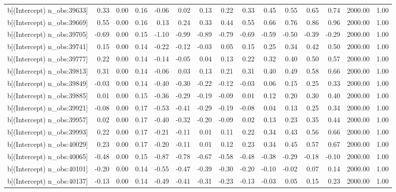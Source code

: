 \begin{table}[ht]
\begin{tabular}{rrrrrrrrrrrrrrr}
  b[(Intercept) n\_obs:39633] & 0.33 & 0.00 & 0.16 & -0.06 & 0.02 & 0.13 & 0.22 & 0.33 & 0.45 & 0.55 & 0.65 & 0.74 & 2000.00 & 1.00 \\ 
  b[(Intercept) n\_obs:39669] & 0.55 & 0.00 & 0.16 & 0.13 & 0.24 & 0.33 & 0.44 & 0.55 & 0.66 & 0.76 & 0.86 & 0.96 & 2000.00 & 1.00 \\ 
  b[(Intercept) n\_obs:39705] & -0.69 & 0.00 & 0.15 & -1.10 & -0.99 & -0.89 & -0.79 & -0.69 & -0.59 & -0.50 & -0.39 & -0.29 & 2000.00 & 1.00 \\ 
  b[(Intercept) n\_obs:39741] & 0.15 & 0.00 & 0.14 & -0.22 & -0.12 & -0.03 & 0.05 & 0.15 & 0.25 & 0.34 & 0.42 & 0.50 & 2000.00 & 1.00 \\ 
  b[(Intercept) n\_obs:39777] & 0.22 & 0.00 & 0.14 & -0.14 & -0.05 & 0.04 & 0.13 & 0.22 & 0.32 & 0.40 & 0.50 & 0.57 & 2000.00 & 1.00 \\ 
  b[(Intercept) n\_obs:39813] & 0.31 & 0.00 & 0.14 & -0.06 & 0.03 & 0.13 & 0.21 & 0.31 & 0.40 & 0.49 & 0.58 & 0.66 & 2000.00 & 1.00 \\ 
  b[(Intercept) n\_obs:39849] & -0.03 & 0.00 & 0.14 & -0.40 & -0.30 & -0.22 & -0.12 & -0.03 & 0.06 & 0.15 & 0.25 & 0.33 & 2000.00 & 1.00 \\ 
  b[(Intercept) n\_obs:39885] & 0.01 & 0.00 & 0.15 & -0.36 & -0.29 & -0.19 & -0.09 & 0.01 & 0.12 & 0.20 & 0.30 & 0.40 & 2000.00 & 1.00 \\ 
  b[(Intercept) n\_obs:39921] & -0.08 & 0.00 & 0.17 & -0.53 & -0.41 & -0.29 & -0.19 & -0.08 & 0.04 & 0.13 & 0.25 & 0.34 & 2000.00 & 1.00 \\ 
  b[(Intercept) n\_obs:39957] & 0.02 & 0.00 & 0.17 & -0.40 & -0.32 & -0.20 & -0.09 & 0.02 & 0.13 & 0.23 & 0.35 & 0.44 & 2000.00 & 1.00 \\ 
  b[(Intercept) n\_obs:39993] & 0.22 & 0.00 & 0.17 & -0.21 & -0.11 & 0.01 & 0.11 & 0.22 & 0.34 & 0.43 & 0.56 & 0.66 & 2000.00 & 1.00 \\ 
  b[(Intercept) n\_obs:40029] & 0.23 & 0.00 & 0.17 & -0.20 & -0.11 & 0.01 & 0.12 & 0.23 & 0.34 & 0.45 & 0.57 & 0.67 & 2000.00 & 1.00 \\ 
  b[(Intercept) n\_obs:40065] & -0.48 & 0.00 & 0.15 & -0.87 & -0.78 & -0.67 & -0.58 & -0.48 & -0.38 & -0.29 & -0.18 & -0.10 & 2000.00 & 1.00 \\ 
  b[(Intercept) n\_obs:40101] & -0.20 & 0.00 & 0.14 & -0.55 & -0.47 & -0.39 & -0.30 & -0.20 & -0.10 & -0.02 & 0.07 & 0.14 & 2000.00 & 1.00 \\ 
  b[(Intercept) n\_obs:40137] & -0.13 & 0.00 & 0.14 & -0.49 & -0.41 & -0.31 & -0.23 & -0.13 & -0.03 & 0.05 & 0.15 & 0.23 & 2000.00 & 1.00 \\ 

\end{tabular}
\end{table}
